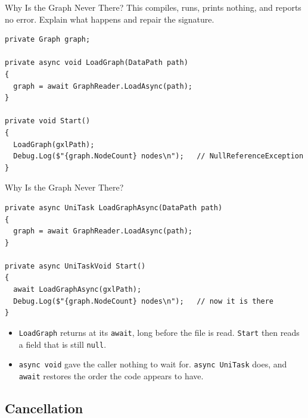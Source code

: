 \begin{exerciseframe}{Why Is the Graph Never There?}
  This compiles, runs, prints nothing, and reports no error. Explain what
  happens and repair the signature.
  \vspace{1ex}

  \begin{lstlisting}[basicstyle=\scriptsize\ttfamily]
private Graph graph;

private async void LoadGraph(DataPath path)
{
  graph = await GraphReader.LoadAsync(path);
}

private void Start()
{
  LoadGraph(gxlPath);
  Debug.Log($"{graph.NodeCount} nodes\n");   // NullReferenceException
}
  \end{lstlisting}
\end{exerciseframe}

\begin{solutionframe}{Why Is the Graph Never There?}
  \begin{lstlisting}[basicstyle=\scriptsize\ttfamily]
private async UniTask LoadGraphAsync(DataPath path)
{
  graph = await GraphReader.LoadAsync(path);
}

private async UniTaskVoid Start()
{
  await LoadGraphAsync(gxlPath);
  Debug.Log($"{graph.NodeCount} nodes\n");   // now it is there
}
  \end{lstlisting}
  \vspace{1ex}

  \begin{itemize}
    \item \texttt{LoadGraph} returns at its \texttt{await}, long before the
      file is read. \texttt{Start} then reads a field that is still
      \texttt{null}.
    \item \texttt{async void} gave the caller nothing to wait for.
      \texttt{async UniTask} does, and \texttt{await} restores the order the
      code appears to have.
  \end{itemize}
  \vspace{1ex}

\end{solutionframe}

\subsection{Cancellation}

